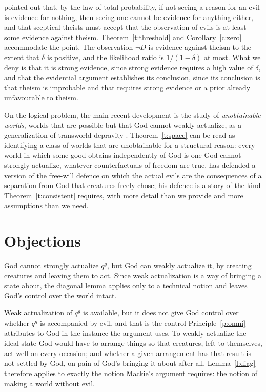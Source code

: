 \documentclass{situationist-preprint}
\begin{document}
\citet{BentonHawthorneIsaacs2016} pointed out that, by the law of total probability, if not seeing a reason for an evil is evidence for nothing, then seeing one cannot be evidence for anything either, and that sceptical theists must accept that the observation of evils is at least some evidence against theism. Theorem~\ref{t:threshold} and Corollary~\ref{c:zero} accommodate the point. The observation $\neg D$ is evidence against theism to the extent that $\delta$ is positive, and the likelihood ratio is $1/(1-\delta)$ at most. What we deny is that it is strong evidence, since strong evidence requires a high value of $\delta$, and that the evidential argument establishes its conclusion, since its conclusion is that theism is improbable and that requires strong evidence or a prior already unfavourable to theism.

On the logical problem, the main recent development is the study of \emph{unobtainable worlds}, worlds that are possible but that God cannot weakly actualize, as a generalization of transworld depravity \citep{Otte2009}. Theorem~\ref{t:space} can be read as identifying a class of worlds that are unobtainable for a structural reason: every world in which some good obtains independently of God is one God cannot strongly actualize, whatever counterfactuals of freedom are true. \citet{vanInwagen2006} has defended a version of the free-will defence on which the actual evils are the consequences of a separation from God that creatures freely chose; his defence is a story of the kind Theorem~\ref{t:consistent} requires, with more detail than we provide and more assumptions than we need.

\section{Objections}\label{s:objections}

\begin{objection}
God cannot strongly actualize $q^{g}$, but God can weakly actualize it, by creating creatures and leaving them to act. Since weak actualization is a way of bringing a state about, the diagonal lemma applies only to a technical notion and leaves God's control over the world intact.
\end{objection}

\begin{reply}
Weak actualization of $q^{g}$ is available, but it does not give God control over whether $q^{g}$ is accompanied by evil, and that is the control Principle~\ref{p:omni} attributes to God in the instance the argument uses. To weakly actualize the ideal state God would have to arrange things so that creatures, left to themselves, act well on every occasion; and whether a given arrangement has that result is not settled by God, on pain of God's bringing it about after all. Lemma~\ref{l:diag} therefore applies to exactly the notion Mackie's argument requires: the notion of making a world without evil.
\end{reply}
\end{document}
